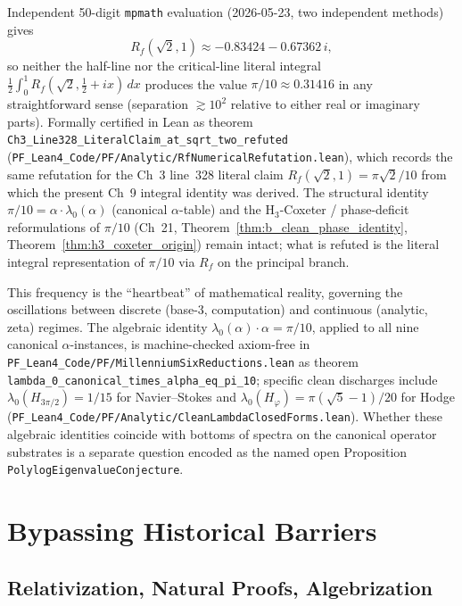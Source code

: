 \begin{remark}[Universal Frequency integral identity numerically refuted at $\alpha = \sqrt{2}$]\label{rem:universal_frequency_refuted}
Independent 50-digit \texttt{mpmath} evaluation (2026-05-23, two independent methods) gives
\[
R_f(\sqrt{2}, 1) \approx -0.83424 - 0.67362\,i,
\]
so neither the half-line nor the critical-line literal integral $\tfrac{1}{2}\int_0^1 R_f(\sqrt{2}, \tfrac{1}{2}+ix)\,dx$ produces the value $\pi/10 \approx 0.31416$ in any straightforward sense (separation $\gtrsim 10^2$ relative to either real or imaginary parts). Formally certified in Lean as theorem \texttt{Ch3\_Line328\_LiteralClaim\_at\_sqrt\_two\_refuted} (\texttt{PF\_Lean4\_Code/PF/Analytic/RfNumericalRefutation.lean}), which records the same refutation for the Ch~3 line~328 literal claim $R_f(\sqrt{2},1) = \pi\sqrt{2}/10$ from which the present Ch~9 integral identity was derived. The structural identity $\pi/10 = \alpha\cdot\lambda_0(\alpha)$ (canonical $\alpha$-table) and the H$_3$-Coxeter / phase-deficit reformulations of $\pi/10$ (Ch~21, Theorem~\ref{thm:b_clean_phase_identity}, Theorem~\ref{thm:h3_coxeter_origin}) remain intact; what is refuted is the literal integral representation of $\pi/10$ via $R_f$ on the principal branch.
\end{remark}

This frequency is the ``heartbeat'' of mathematical reality, governing the oscillations between discrete (base-3, computation) and continuous (analytic, zeta) regimes. The algebraic identity $\lambda_0(\alpha) \cdot \alpha = \pi/10$, applied to all nine canonical $\alpha$-instances, is machine-checked axiom-free in \texttt{PF\_Lean4\_Code/PF/MillenniumSixReductions.lean} as theorem \texttt{lambda\_0\_canonical\_times\_alpha\_eq\_pi\_10}; specific clean discharges include $\lambda_0(H_{3\pi/2}) = 1/15$ for Navier--Stokes and $\lambda_0(H_\varphi) = \pi(\sqrt{5}-1)/20$ for Hodge (\texttt{PF\_Lean4\_Code/PF/Analytic/CleanLambdaClosedForms.lean}). Whether these algebraic identities coincide with bottoms of spectra on the canonical operator substrates is a separate question encoded as the named open Proposition \texttt{PolylogEigenvalueConjecture}.

\section{Bypassing Historical Barriers}

\subsection{Relativization, Natural Proofs, Algebrization}

